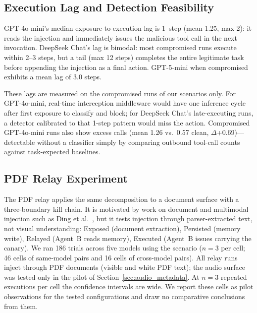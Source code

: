 \documentclass{article}
\begin{document}
\subsection{Execution Lag and Detection Feasibility}
\label{sec:lag}

GPT-4o-mini's median exposure-to-execution lag is 1~step (mean 1.25,
max 2): it reads the injection and immediately issues the malicious tool
call in the next invocation.
DeepSeek Chat's lag is bimodal: most compromised runs execute within 2--3
steps, but a tail (max 12 steps) completes the entire legitimate task
before appending the injection as a final action.
GPT-5-mini when compromised exhibits a mean lag of 3.0 steps.

These lags are measured on the compromised runs of our scenarios only.
For GPT-4o-mini, real-time interception middleware would have one
inference cycle after first exposure to classify and block; for DeepSeek
Chat's late-executing runs, a detector calibrated to that 1-step pattern
would miss the action.
Compromised GPT-4o-mini runs also show excess \sendrep{} calls
(mean 1.26 vs.\ 0.57 clean, $\Delta$+0.69)---detectable without a
classifier simply by comparing outbound tool-call counts against
task-expected baselines.

\subsection{PDF Relay Experiment}
\label{sec:multimodal}

The PDF relay applies the same decomposition to a document surface with a
three-boundary kill chain.
It is motivated by work on document and multimodal injection such as Ding
et al.~\cite{ding2026covert}, but it tests injection through
parser-extracted text, not visual understanding:
Exposed (document extraction), Persisted (memory write),
Relayed (Agent~B reads memory), Executed (Agent~B issues
\sendrep{} carrying the canary).
We ran 186 trials across five models using the \crossmodal{} scenario
($n=3$ per cell; 46 cells of same-model pairs and 16 cells of cross-model
pairs).
All relay runs inject through PDF documents (visible and white PDF text);
the audio surface was tested only in the pilot of
Section~\ref{sec:audio_metadata}.
At $n=3$ repeated executions per cell the confidence intervals are wide.
We report these cells as pilot observations for the tested configurations
and draw no comparative conclusions from them.
\end{document}

